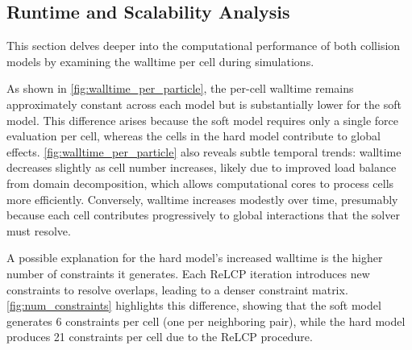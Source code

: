 \documentclass[conference]{IEEEtran}
\begin{document}
\subsection{Runtime and Scalability Analysis}
\label{sec:complexity_scalability}

This section delves deeper into the computational performance of both collision models by examining the walltime per cell during simulations.

As shown in \autoref{fig:walltime_per_particle}, the per-cell walltime remains approximately constant across each model but is substantially lower for the soft model. This difference arises because the soft model requires only a single force evaluation per cell, whereas the cells in the hard model contribute to global effects. \autoref{fig:walltime_per_particle} also reveals subtle temporal trends: walltime decreases slightly as cell number increases, likely due to improved load balance from domain decomposition, which allows computational cores to process cells more efficiently. Conversely, walltime increases modestly over time, presumably because each cell contributes progressively to global interactions that the solver must resolve.

A possible explanation for the hard model's increased walltime is the higher number of constraints it generates. Each ReLCP iteration introduces new constraints to resolve overlaps, leading to a denser constraint matrix. \autoref{fig:num_constraints} highlights this difference, showing that the soft model generates 6 constraints per cell (one per neighboring pair), while the hard model produces 21 constraints per cell due to the ReLCP procedure.
\end{document}
